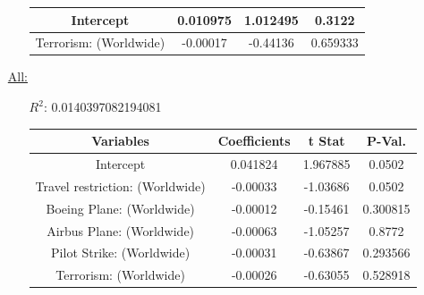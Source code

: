 \documentclass[12pt]{report}
\begin{document}
\begin{enumerate}
\begin{enumerate}
\begin{tabular}{|c|c|c|c|}
                    Intercept & 0.010975 & 1.012495 &0.3122\\ \hline
                    Terrorism: (Worldwide) & -0.00017 & -0.44136&0.659333 \\ \hline
                    \bottomrule
                \end{tabular}




        \end{enumerate}
    \item[\underline{All:}]
    \begin{samepage}

        \begin{enumerate}
            \item[$R^2$:]0.0140397082194081
            \item[]


                \begin{tabular}{|c|c|c|c|}
                    \toprule \hline
                    \textbf{Variables} & \textbf{Coefficients} & \textbf{t Stat}&\textbf{P-Val.} \\ \hline

                    Intercept & 0.041824 & 1.967885 &0.0502 \\ \hline
                    Travel restriction: (Worldwide) & -0.00033 & -1.03686 &0.0502 \\ \hline
                    Boeing Plane: (Worldwide) & -0.00012 & -0.15461 &0.300815 \\ \hline
                    Airbus Plane: (Worldwide) & -0.00063 & -1.05257&0.8772 \\ \hline
                    Pilot Strike: (Worldwide) & -0.00031 & -0.63867&0.293566 \\ \hline
                    Terrorism: (Worldwide) & -0.00026 & -0.63055&0.528918 \\ \hline
                    \bottomrule
                \end{tabular}



        \end{enumerate}
        \end{samepage}
\end{enumerate}
\end{document}
